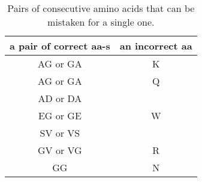 \documentclass{article}
\begin{document}
\begin{landscape}

\begin{table}[ht]\footnotesize
\vspace{3mm}
{\centering
\begin{center}
\begin{tabular}{|c|c|}
  \hline
  a pair of correct aa-s & an incorrect aa \\
  \hline
  AG or GA & K \\
  \hline
  AG or GA & Q \\
  \hline
  AD or DA & \multirow{3}{*}{W} \\
  EG or GE & \\
  SV or VS & \\
  \hline
  GV or VG & R \\
  \hline
  GG & N \\
  \hline
\end{tabular}
\end{center}
\par}
\centering
\caption{Pairs of consecutive amino acids that can be mistaken for a single one.}
\vspace{3mm}
\label{table:errors-vs}
\end{table}
\end{landscape}
\end{document}
